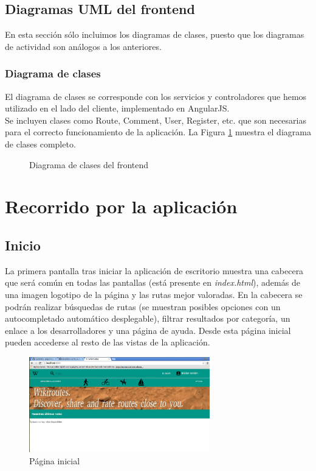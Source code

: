 \documentclass[11pt,a4paper]{article}
\begin{document}
\subsection{Diagramas UML del frontend}

En esta sección sólo incluimos los diagramas de clases, puesto que los diagramas de actividad son análogos a los anteriores.

\subsubsection{Diagrama de clases}

El diagrama de clases se corresponde con los servicios y controladores que hemos utilizado en el lado del cliente, implementado en AngularJS.\\

Se incluyen clases como Route, Comment, User, Register, etc. que son necesarias para el correcto funcionamiento de la aplicación. La Figura \ref{fig:clasesfrontend} muestra el diagrama de clases completo.

\begin{figure}
\centering
\clasesfrontend
\caption{Diagrama de clases del frontend}
\label{fig:clasesfrontend}
\end{figure}


\clearpage

\section{Recorrido por la aplicación}
\subsection{Inicio}
La primera pantalla tras iniciar la aplicación de escritorio muestra una cabecera que será común en todas las pantallas (está presente en \textit{index.html}), además de una imagen logotipo de la página y las rutas mejor valoradas. En la cabecera se podrán realizar búsquedas de rutas (se muestran posibles opciones con un autocompletado automático desplegable), filtrar resultados por categoría, un enlace a los desarrolladores y una página de ayuda. Desde esta página inicial pueden accederse al resto de las vistas de la aplicación.
\begin{figure}[h]
\centering
  \includegraphics[width=0.7\textwidth]{./imagenes/inicial}
  \caption{Página inicial}
  \label{fig: Página inicial}
\end{figure}
\end{document}
